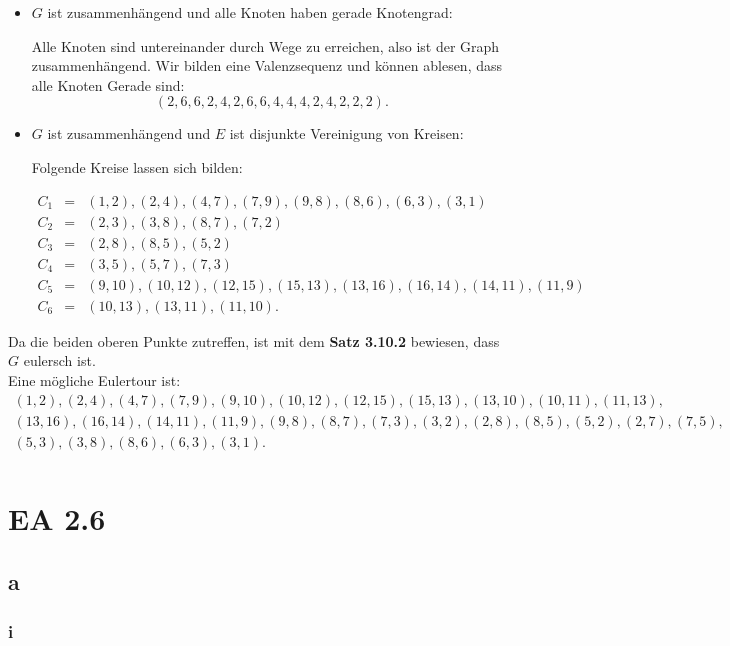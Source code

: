 \documentclass[12pt]{article}
\begin{document}
\begin{itemize}
\item $G$ ist zusammenhängend und alle Knoten haben gerade Knotengrad:

Alle Knoten sind untereinander durch Wege zu erreichen, also ist der Graph zusammenhängend. 
Wir bilden eine Valenzsequenz und können ablesen, dass alle Knoten Gerade sind:
$$
(2, 6, 6, 2, 4, 2, 6, 6, 4, 4, 4, 2, 4, 2, 2, 2) .
$$


\item $G$ ist zusammenhängend und $E$ ist disjunkte Vereinigung von Kreisen:

Folgende Kreise lassen sich bilden:

\begin{eqnarray*}
C_1&=&(1, 2), (2,4),(4,7),(7,9),(9,8),(8,6),(6,3),(3,1) \\
C_2&=&(2,3),(3,8),(8,7),(7,2) \\
C_3&=&(2,8),(8,5),(5,2) \\
C_4&=&(3,5),(5,7),(7,3) \\
C_5&=&(9,10),(10,12),(12,15),(15,13),(13,16),(16,14),(14,11),(11,9) \\
C_6&=&(10,13),(13,11),(11,10).
\end{eqnarray*}

\end{itemize}

Da die beiden oberen Punkte zutreffen, ist mit dem \textbf{Satz 3.10.2} bewiesen, dass $G$ 
eulersch ist. \\

Eine mögliche Eulertour ist:
\begin{eqnarray*}
(1, 2), (2, 4), (4,7),(7,9),(9,10),(10,12),(12,15),(15,13),(13,10),(10,11),(11,13), \\
(13,16),(16,14),(14,11),(11,9),(9,8),(8,7),(7,3),(3,2),(2,8),(8,5),(5,2),(2,7),(7,5),\\
(5,3),(3,8),(8,6),(6,3),(3,1). \\
\end{eqnarray*}


\section*{EA 2.6}
\subsection*{a}
\subsubsection*{i}
\end{document}
